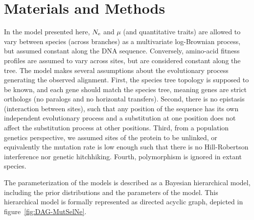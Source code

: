 \documentclass{MBE}
\begin{document}
	\section{Materials and Methods}
	\label{sec:MatMet}

	In the model presented here, $N_{\text{e}}$ and $\mu$ (and quantitative traits) are allowed to vary between species (across branches) as a multivariate log-Brownian process, but assumed constant along the DNA sequence.
	Conversely, amino-acid fitness profiles are assumed to vary across sites, but are considered constant along the tree.
	The model makes several assumptions about the evolutionary process generating the observed alignment.
	First, the species tree topology is supposed to be known, and each gene should match the species tree, meaning genes are strict orthologs (no paralogs and no horizontal transfers).
	Second, there is no epistasis (interaction between sites), such that any position of the sequence has its own independent evolutionary process and a substitution at one position does not affect the substitution process at other positions.
	Third, from a population genetics perspective, we assumed sites of the protein to be unlinked, or equivalently the mutation rate is low enough such that there is no Hill-Robertson interference nor genetic hitchhiking.
	Fourth, polymorphism is ignored in extant species.

	The parameterization of the models is described as a Bayesian hierarchical model, including the prior distributions and the parameters of the model.
	This hierarchical model is formally represented as directed acyclic graph, depicted in figure~\ref{fig:DAG-MutSelNe}.
\end{document}
